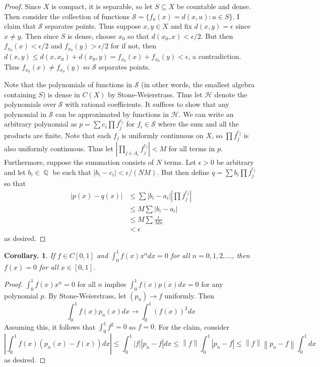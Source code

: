 \documentclass[11pt, a4paper]{memoir}
\DeclareMathOperator{\Q}{{\mathbb{Q}}}
\newcommand{\norm}[1]{\ensuremath{\left\lVert#1\right\rVert}}
\theoremstyle{change}
\newtheorem{corollary}[theorem]{Corollary.}
\theoremstyle{plain}
\theoremstyle{nonumberplain}
\newtheorem{proof}{Proof}
\numberwithin{equation}{section}
\begin{document}
\begin{proof}
    Since $X$ is compact, it is separable, so let $S\subseteq X$ be countable and dense.
    Then consider the collection of functions $\mathcal{S}=\{f_u(x)=d(x,u):u\in S\}$.
    I claim that $\mathcal{S}$ separates points.
    Thus suppose $x,y\in X$ and fix $d(x,y)=\epsilon$ since $x\neq y$.
    Then since $S$ is dense, choose $x_0$ so that $d(x_0,x)<\epsilon/2$.
    But then $f_{x_0}(x)<\epsilon/2$ and $f_{x_0}(y)>\epsilon/2$ for if not, then $d(x,y)\leq d(x,x_0)+d(x_0,y)=f_{x_0}(x)+f_{x_0}(y)<\epsilon$, a contradiction.
    Thus $f_{x_0}(x)\neq f_{x_0}(y)$ so $\mathcal{S}$ separates points.

    Note that the polynomials of functions in $\mathcal{S}$ (in other words, the smallest algebra containing $S$) is dense in $C(X)$ by Stone-Weierstrass.
    Thus let $\mathcal{H}$ denote the polynomials over $\mathcal{S}$ with rational coefficients.
    It suffices to show that any polynomial in $\mathcal{S}$ can be approximated by functions in $\mathcal{H}$.
    We can write an arbitrary polynomial as $p=\sum c_i \prod f_j^{c_j}$ for $f_i\in\mathcal{S}$ where the sum and all the products are finite.
    Note that each $f_j$ is uniformly continuous on $X$, so $\prod f_j^{c_j}$ is also uniformly continuous.
    Thus let $\left\lvert\prod_{j\in A_i} f_j^{c_j}\right\rvert<M$ for all terms in $p$.
    Furthermore, suppose the summation consists of $N$ terms.
    Let $\epsilon>0$ be arbitrary and let $b_i\in\Q$ be such that $|b_i-c_i|<\epsilon/(NM)$.
    But then define $q=\sum b_i\prod f_j^{c_j}$ so that
    \begin{align*}
        |p(x)-q(x)|&\leq\sum |b_i-a_i|\left\lvert\prod f_j^{c_j}\right\rvert\\
                   &\leq M\sum|b_i-a_i|\\
                   &\leq M\sum \frac{\epsilon}{Mn}\\
                   &<\epsilon
    \end{align*}
    as desired.
\end{proof}
\begin{corollary}
    If $f\in C[0,1]$ and $\int_0^1 f(x)x^n dx = 0$ for all $n=0,1,2,\ldots$, then $f(x)=0$ for all $x\in[0,1]$.
\end{corollary}
\begin{proof}
    $\int_0^1 f(x)x^n=0$ for all $n$ implies $\int_0^1 f(x)p(x)dx=0$ for any polynomial $p$.
    By Stone-Weierstrass, let $(p_n)\to f$ uniformly.
    Then
    \[\int_0^1f(x)p_n(x)dx\to\int_0^1 (f(x))^2dx\]
    Assuming this, it follows that $\int_0^1 f^2=0$ so $f=0$.
    For the claim, consider
    \[|\int_0^1 f(x)(p_n(x)-f(x))dx|\leq\int_0^1|f||p_n-f|dx\leq\norm{f}\int_0^1|p_n-f|\leq\norm{f}\norm{p_n-f}\int_0^1 dx\]
    as desired.
\end{proof}
\end{document}
